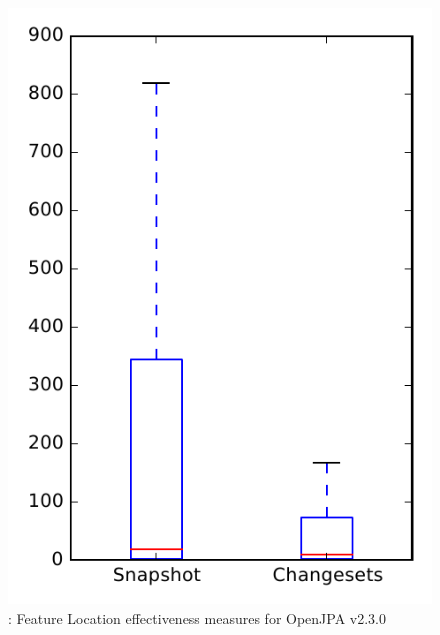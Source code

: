 
\begin{figure}
\centering
\includegraphics[height=0.4\textheight]{figures/flt/rq1_openjpa_no_outlier}
\caption{\fone: Feature Location effectiveness measures for OpenJPA v2.3.0}
\label{fig:flt:rq1:openjpa}
\end{figure}
